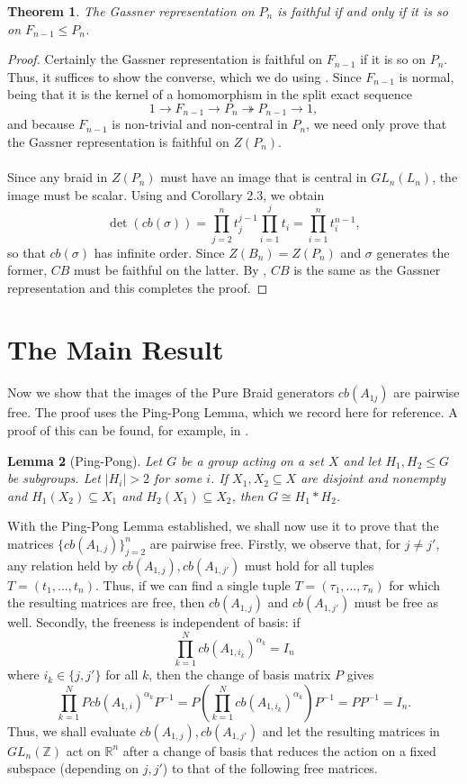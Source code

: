 \documentclass[11pt]{article}
\newtheorem{lemma}{Lemma}[section]
\newtheorem{theorem}[lemma]{Theorem}
\begin{document}
\begin{theorem}\label{thm:pn-faithful}
	The Gassner representation on $P_n$ is faithful if and only if it is so on
	$F_{n-1}\leq P_n$.
\end{theorem}

\begin{proof}
	Certainly the Gassner representation is faithful on $F_{n-1}$ if it is so on $P_n$. Thus, it suffices to show the converse, which we do using . Since $F_{n-1}$ is normal, being that it is the kernel of a homomorphism in the split exact sequence
		$$1\to F_{n-1}\to P_n\twoheadrightarrow P_{n-1}\to 1,$$
	and because $F_{n-1}$ is non-trivial and non-central in $P_n$, we need only prove that the Gassner representation is faithful on $Z(P_n)$.
	\\
	\\
	Since any braid in $Z(P_n)$ must have an image that is central in $GL_n(L_n)$, the image must be scalar. Using  and Corollary 2.3, we obtain
		$$\det(cb(\sigma))=\prod_{j=2}^nt_j^{j-1}\prod_{i=1}^{j}t_i=\prod_{i=1}^nt_i^{n-1},$$
	so that $cb(\sigma)$ has infinite order. Since $Z(B_n)=Z(P_n)$ and $\sigma$ generates the former, $CB$ must be faithful on the latter. By , $CB$ is the same as the Gassner representation and this completes the proof.
\end{proof}

\section{The Main Result}\label{sec:main}
Now we show that the images of the Pure Braid generators $cb(A_{1j})$ are pairwise free. The proof uses the Ping-Pong Lemma, which we record here for reference. A proof of this can be found, for example, in \cite{geo}.

\begin{lemma}[Ping-Pong]\label{lem:pp}
	Let $G$ be a group acting on a set $X$ and let $H_1,H_2\leq G$ be subgroups. Let $|H_i|>2$ for some $i$. If $X_1,X_2\subseteq X$ are disjoint and nonempty and $H_1(X_2)\subseteq X_1$ and $H_2(X_1)\subseteq X_2$, then $G\cong H_1\ast H_2$.
\end{lemma}

\noindent With the Ping-Pong Lemma established, we shall now use it to prove that the matrices $\{cb(A_{1,j})\}_{j=2}^n$ are pairwise free. Firstly, we observe that, for $j\neq j'$, any relation held by $cb(A_{1,j}),cb(A_{1,j'})$ must hold for all tuples $T=(t_1,\hdots,t_n)$. Thus, if we can find a single tuple $T=(\tau_1,\hdots,\tau_n)$ for which the resulting matrices are free, then $cb(A_{1,j})$ and $cb(A_{1,j'})$ must be free as well. Secondly, the freeness is independent of basis: if
	$$\prod_{k=1}^N cb(A_{1,i_k})^{\alpha_k}=I_n$$
where $i_k\in \{j,j'\}$ for all $k$, then the change of basis matrix $P$ gives
	$$\prod_{k=1}^N Pcb(A_{1,i})^{\alpha_k}P^{-1}=P\left(\prod_{k=1}^N cb(A_{1,i_k})^{\alpha_k}\right)P^{-1}=PP^{-1}=I_n.$$
Thus, we shall evaluate $cb(A_{1,j}),cb(A_{1,j'})$ and let the resulting matrices in $GL_n(\mathbb{Z})$ act on $\mathbb{R}^n$ after a change of basis that reduces the action on a fixed subspace (depending on $j,j'$) to that of the following free matrices.
\end{document}
